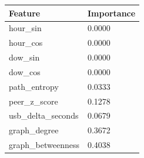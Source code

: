 \begin{tabular}{ll}
\toprule
Feature & Importance \\
\midrule
hour\_sin & 0.0000 \\
hour\_cos & 0.0000 \\
dow\_sin & 0.0000 \\
dow\_cos & 0.0000 \\
path\_entropy & 0.0333 \\
peer\_z\_score & 0.1278 \\
usb\_delta\_seconds & 0.0679 \\
graph\_degree & 0.3672 \\
graph\_betweenness & 0.4038 \\
\bottomrule
\end{tabular}